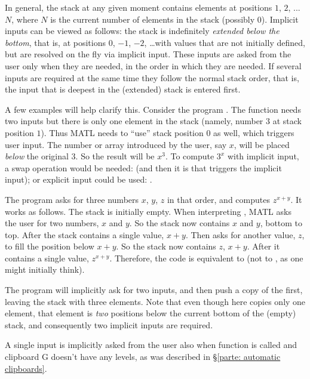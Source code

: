 \documentclass[12pt]{article}
\newcommand{\matl}[1]{{\ttfamily\color{fgmatl}{\hl{#1}}}} %
\begin{document}
In general, the stack at any given moment contains elements at positions $1$, $2$, ... $N$, where $N$ is the current number of elements in the stack (possibly $0$). Implicit inputs can be viewed as follows: the stack is indefinitely \emph{extended below the bottom}, that is, at positions $0$, $-1$, $-2$, \ldots with values that are not initially defined, but are resolved on the fly via implicit input. These inputs are asked from the user only when they are needed, in the order in which they are needed. If several inputs are required at the same time they follow the normal stack order, that is, the input that is deepest in the (extended) stack is entered first.

A few examples will help clarify this. Consider the program \matl{3\textasciicircum{}}. The function \matl{\textasciicircum{}} needs two inputs but there is only one element in the stack (namely, number $3$ at stack position $1$). Thus MATL needs to ``use'' stack position $0$ as well, which triggers user input. The number or array introduced by the user, say $x$, will be placed \emph{below} the original $3$. So the result will be $x^3$. To compute $3^x$ with implicit input, a swap operation would be needed: \matl{3w\textasciicircum{}} (and then it is \matl{w}  that triggers the implicit input); or explicit input could be used: \matl{3i\textasciicircum{}} .

The program \matl{+\textasciicircum{}} asks for three numbers $x$, $y$, $z$ in that order, and computes $z^{x+y}$. It works as follows. The stack is initially empty. When interpreting \matl{+}, MATL asks the user for two numbers, $x$ and $y$. So the stack now contains $x$ and $y$, bottom to top. After \matl{+} the stack contains a single value, $x+y$. Then \matl{\textasciicircum{}} asks for another value, $z$, to fill the position below $x+y$. So the stack now contains $z$, $x+y$. After \matl{\textasciicircum{}} it contains a single value, $z^{x+y}$. Therefore, the code is equivalent to \matl{ii+iw\textasciicircum{}} (not to \matl{iii+\textasciicircum{}}, as one might initially think).

The program \matl{y} will implicitly ask for two inputs, and then push a copy of the first, leaving the stack with three elements. Note that even though \matl{y} here copies only one element, that element is \emph{two} positions below the current bottom of the (empty) stack, and consequently two implicit inputs are required.

A single input is implicitly asked from the user also when function \matl{G} is called and clipboard G doesn't have any levels, as was described in \S\ref{parte: automatic clipboards}.
\end{document}
